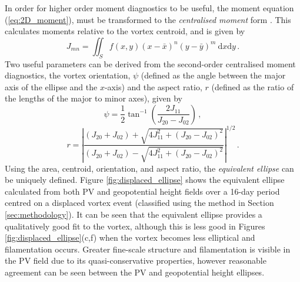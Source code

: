 In order for higher order moment diagnostics to be useful, the moment equation
(\ref{eq:2D_moment}), must be transformed to the \emph{centralised moment}
form \citep{Hall2005}. This calculates moments relative to the vortex centroid,
and is given by
\begin{equation}
J_{mn} = \iint_{S} f(x,y)(x-\bar{x})^n(y-\bar{y})^m~\mathrm{d}x\mathrm{d}y \, .
\end{equation}
Two useful parameters can be derived from the second-order centralised moment
diagnostics, the vortex orientation, $\psi$ (defined as the angle between the
major axis of the ellipse and the $x$-axis) and the aspect ratio, $r$ (defined
as the ratio of the lengths of the major to minor axes), given by
\begin{equation}
\psi = \frac{1}{2} \tan^{-1} \left( \frac{2J_{11}}{J_{20}-J_{02}} \right) \, ,
\end{equation}
\begin{equation}
r = \left| \frac{(J_{20}+J_{02})+\sqrt{4J_{11}^2+(J_{20}-J_{02})^2}}
  {(J_{20}+J_{02})-\sqrt{4J_{11}^2+(J_{20}-J_{02})^2}} \right|^{1/2} \, .
\end{equation}
Using the area, centroid, orientation, and aspect ratio, the \emph{equivalent
  ellipse} can be uniquely defined. Figure \ref{fig:displaced_ellipse} shows the
equivalent ellipse calculated from both PV and geopotential height fields over a
16-day period centred on a displaced vortex event (classified using the method
in Section \ref{sec:methodology}). It can be seen that the equivalent ellipse
provides a qualitatively good fit to the vortex, although this is less good in
Figures \ref{fig:displaced_ellipse}(c,f) when the vortex becomes less elliptical
and filamentation occurs. Greater fine-scale structure and filamentation is
visible in the PV field due to its quasi-conservative properties, however
reasonable agreement can be seen between the PV and geopotential height
ellipses. 

